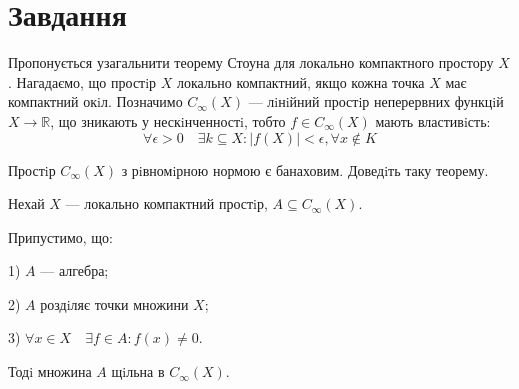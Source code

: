 
\chapter{Завдання \theHchapter}

\begin{tcolorbox}[title=Завдання]
    Пропонується узагальнити теорему Стоуна для 
    локально компактного простору $X$. 
    Нагадаємо, що простiр $X$ локально компактний, якщо кожна точка 
    $X$ має компактний окiл.
    Позначимо $C_{\infty}(X)$ — лiнiйний простiр неперервних функцiй 
    $X \rightarrow \mathbb{R}$, що зникають у нескiнченностi, 
    тобто $f \in C_{\infty}(X)$ мають властивiсть:
    $$ \forall \epsilon > 0 \quad \exists k \subseteq X: |f(X)| < \epsilon, 
    \forall x \notin K $$

    Простiр $C_{\infty}(X)$ з рiвномiрною нормою є банаховим.
    Доведiть таку теорему.
\end{tcolorbox}


\begin{tcolorbox}[title=Теорема Cтоуна для локально компактного простору.]
    Нехай $X$ — локально компактний простiр, $A \subseteq C_{\infty}(X)$. 
    
    
    Припустимо, що:


    1) $A$ — алгебра;

    
    2) $A$ роздiляє точки множини $X$;
    
    
    3) $\forall x \in X \quad \exists f \in A: f(x) \neq 0$.
    
    
    Тодi множина $A$ щiльна в $C_{\infty}(X)$.
\end{tcolorbox}

